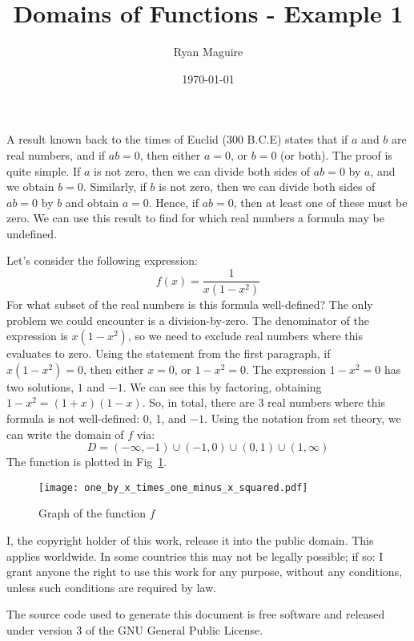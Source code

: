\documentclass{article}
\title{Domains of Functions - Example 1}
\author{Ryan Maguire}
\date{\today}
\begin{document}
    \maketitle
    A result known back to the times of Euclid (300 B.C.E) states that if
    $a$ and $b$ are real numbers, and if $ab=0$, then either $a=0$, or
    $b=0$ (or both). The proof is quite simple. If $a$ is not zero, then
    we can divide both sides of $ab=0$ by $a$, and we obtain $b=0$. Similarly,
    if $b$ is not zero, then we can divide both sides of $ab=0$ by $b$ and
    obtain $a=0$. Hence, if $ab=0$, then at least one of these must be zero.
    We can use this result to find for which real numbers a formula may be
    undefined.
    \par\hfill\par
    Let's consider the following expression:
    \begin{equation}
        f(x)=\frac{1}{x(1-x^{2})}
    \end{equation}
    For what subset of the real numbers is this formula well-defined? The only
    problem we could encounter is a division-by-zero. The denominator of the
    expression is $x(1-x^{2})$, so we need to exclude real numbers where this
    evaluates to zero. Using the statement from the first paragraph, if
    $x(1-x^{2})=0$, then either $x=0$, or $1-x^{2}=0$. The expression
    $1-x^{2}=0$ has two solutions, $1$ and $-1$. We can see this by factoring,
    obtaining $1-x^{2}=(1+x)(1-x)$. So, in total, there are 3 real numbers
    where this formula is not well-defined: 0, 1, and $-1$. Using the notation
    from set theory, we can write the domain of $f$ via:
    \begin{equation}
        D=(-\infty,-1)\cup(-1,0)\cup(0,1)\cup(1,\infty)
    \end{equation}
    The function is plotted in Fig~\ref{fig:graph_of_f}.
    \begin{figure}
        \centering
        \texttt{[image: one\_by\_x\_times\_one\_minus\_x\_squared.pdf]}
        \caption{Graph of the function $f$}
        \label{fig:graph_of_f}
    \end{figure}
    \newpage
    I, the copyright holder of this work, release it into the public domain.
    This applies worldwide. In some countries this may not be legally possible;
    if so: I grant anyone the right to use this work for any purpose, without
    any conditions, unless such conditions are required by law.
    \par\hfill\par
    The source code used to generate this document is free software and released
    under version 3 of the GNU General Public License.
\end{document}
